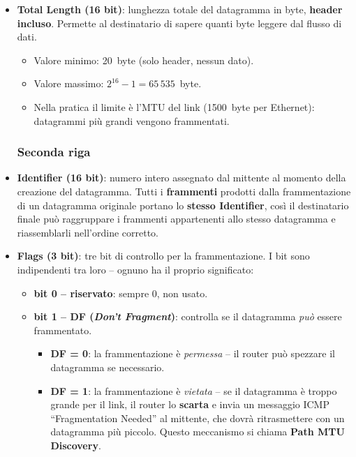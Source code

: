 \documentclass[a4paper,12pt]{report}
\begin{document}
\begin{itemize}
           \item \textbf{Total Length (16 bit)}: lunghezza totale del
          datagramma in byte, \textbf{header incluso}. Permette al
          destinatario di sapere quanti byte leggere dal flusso di
          dati.
          \begin{itemize}
              \item Valore minimo: 20~byte (solo header, nessun dato).
              \item Valore massimo: $2^{16} - 1 = 65\,535$~byte.
              \item Nella pratica il limite è l'MTU del link (1500~byte
                    per Ethernet): datagrammi più grandi vengono
                    frammentati.
          \end{itemize}


\newpage
\subsubsection*{Seconda riga}
   

    \item \textbf{Identifier (16 bit)}: numero intero assegnato dal
          mittente al momento della creazione del datagramma. Tutti i
          \textbf{frammenti} prodotti dalla frammentazione di un
          datagramma originale portano lo \textbf{stesso Identifier},
          così il destinatario finale può raggruppare i frammenti
          appartenenti allo stesso datagramma e riassemblarli
          nell'ordine corretto.
    \item \textbf{Flags (3 bit)}: tre bit di controllo per la
      frammentazione. I bit sono indipendenti tra loro --
      ognuno ha il proprio significato:
      \begin{itemize}
          \item \textbf{bit 0 -- riservato}: sempre 0, non usato.

          \item \textbf{bit 1 -- DF (\textit{Don't Fragment})}:
                controlla se il datagramma \emph{può} essere
                frammentato.
                \begin{itemize}
                    \item \textbf{DF = 0}: la frammentazione è
                          \emph{permessa} -- il router può
                          spezzare il datagramma se necessario.
                    \item \textbf{DF = 1}: la frammentazione è
                          \emph{vietata} -- se il datagramma è
                          troppo grande per il link, il router
                          lo \textbf{scarta} e invia un messaggio
                          ICMP ``Fragmentation Needed'' al
                          mittente, che dovrà ritrasmettere con
                          un datagramma più piccolo. Questo
                          meccanismo si chiama
                          \textbf{Path MTU Discovery}.
                \end{itemize}


\end{itemize}
\end{itemize}
\end{document}
